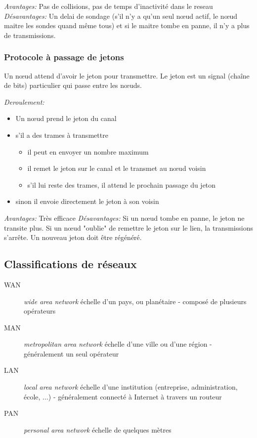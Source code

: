 \documentclass[a4paper, 12pt, french]{article}
\begin{document}
	\emph{Avantages:} Pas de collisions, pas de temps d'inactivité dans le reseau
	\emph{Désavantages:} Un delai de sondage (s'il n'y a qu'un seul nœud actif, le nœud maitre les sondes quand même tous) et si le maitre tombe en panne, il n'y a plus de transmissions.

	\subsubsection{Protocole à passage de jetons}

	Un nœud attend d'avoir le jeton pour transmettre. Le jeton est un signal (chaîne de bits) particulier qui passe entre les nœuds.

	\emph{Deroulement:}
	\begin{itemize}
		\item Un nœud prend le jeton du canal
		\item s'il a des trames à transmettre
		\begin{itemize}
			\item il peut en envoyer un nombre maximum
			\item il remet le jeton sur le canal et le transmet au nœud voisin
			\item s'il lui reste des trames, il attend le prochain passage du jeton
		\end{itemize}
		\item sinon il envoie directement le jeton à son voisin
	\end{itemize}

	\emph{Avantages:} Très efficace
	\emph{Désavantages:} Si un nœud tombe en panne, le jeton ne transite plus. Si un nœud "oublie" de remettre le jeton sur le lien, la transmissions s'arrête. Un nouveau jeton doit être régénéré.

	\subsection{Classifications de réseaux}

	\begin{description}
		\item[WAN] \emph{wide area network} échelle d'un pays, ou planétaire - composé de plusieurs opérateurs
		\item[MAN] \emph{metropolitan area network} échelle d'une ville ou d'une région - généralement un seul opérateur
		\item[LAN] \emph{local area network} échelle d'une institution (entreprise, administration, école, ...) - généralement connecté à Internet à travers un routeur
		\item[PAN] \emph{personal area network} échelle de quelques mètres
	\end{description}
\end{document}
